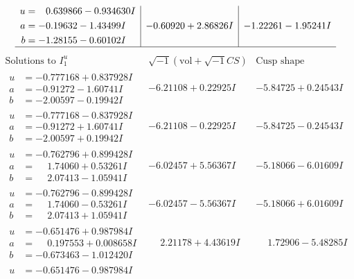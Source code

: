 \documentclass[1p]{elsarticle_modified}
\theoremstyle{definition}
\newcommand{\I}{\sqrt{-1}}
\begin{document}
$$\begin{array}{c|c|c}
\begin{aligned}
u &= \phantom{-}0.639866 - 0.934630 I \\
a &= -0.19632 - 1.43499 I \\
b &= -1.28155 - 0.60102 I\end{aligned}
 & -0.60920 + 2.86826 I & -1.22261 - 1.95241 I\\
 \hline 
 \end{array}$$\newpage$$\begin{array}{c|c|c}  
\text{Solutions to }I^u_{1}& \I (\text{vol} + \sqrt{-1}CS) & \text{Cusp shape}\\
 \hline 
\begin{aligned}
u &= -0.777168 + 0.837928 I \\
a &= -0.91272 - 1.60741 I \\
b &= -2.00597 - 0.19942 I\end{aligned}
 & -6.21108 + 0.22925 I & -5.84725 + 0.24543 I \\ \hline\begin{aligned}
u &= -0.777168 - 0.837928 I \\
a &= -0.91272 + 1.60741 I \\
b &= -2.00597 + 0.19942 I\end{aligned}
 & -6.21108 - 0.22925 I & -5.84725 - 0.24543 I \\ \hline\begin{aligned}
u &= -0.762796 + 0.899428 I \\
a &= \phantom{-}1.74060 + 0.53261 I \\
b &= \phantom{-}2.07413 - 1.05941 I\end{aligned}
 & -6.02457 + 5.56367 I & -5.18066 - 6.01609 I \\ \hline\begin{aligned}
u &= -0.762796 - 0.899428 I \\
a &= \phantom{-}1.74060 - 0.53261 I \\
b &= \phantom{-}2.07413 + 1.05941 I\end{aligned}
 & -6.02457 - 5.56367 I & -5.18066 + 6.01609 I \\ \hline\begin{aligned}
u &= -0.651476 + 0.987984 I \\
a &= \phantom{-}0.197553 + 0.008658 I \\
b &= -0.673463 - 1.012420 I\end{aligned}
 & \phantom{-}2.21178 + 4.43619 I & \phantom{-}1.72906 - 5.48285 I \\ \hline\begin{aligned}
u &= -0.651476 - 0.987984 I \\

\end{aligned}
\end{array}$$
\end{document}
